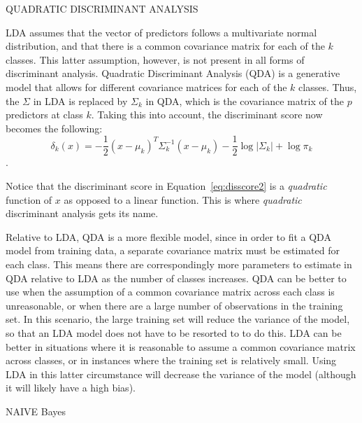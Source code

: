 \documentclass[12pt]{article}
\begin{document}
QUADRATIC DISCRIMINANT ANALYSIS 

LDA assumes that the vector of predictors follows a multivariate normal distribution, 
and that there is a common covariance matrix for each of the $k$ classes.  This latter 
assumption, however, is not present in all forms of discriminant analysis.  Quadratic 
Discriminant Analysis (QDA) is a generative model that allows for different covariance 
matrices for each of the $k$ classes.  Thus, the $\Sigma$ in LDA is replaced by 
$\Sigma_k$ in QDA, which is the covariance matrix of the $p$ predictors at class $k$.  
Taking this into account, the discriminant score now becomes the following:
\begin{equation}
  \label{eq:disscore2}
  \delta_k(x) = -\frac {1} {2} (x - \mu_k) ^ T \Sigma_k ^ {-1} (x - \mu_k) -\frac {1} {2} 
  \log {|\Sigma_k|} + \log {\pi_k}
\end{equation}. 

Notice that the discriminant score in Equation~\eqref{eq:disscore2} is a 
\textit{quadratic} function of $x$ as opposed to a linear function.  This is where 
\textit{quadratic} discriminant analysis gets its name.  

Relative to LDA, QDA is a more flexible model, since in order to fit a QDA model from 
training data, a separate covariance matrix must be estimated for each class.  This 
means there are correspondingly more parameters to estimate in QDA relative to LDA as 
the number of classes increases.  QDA can be better to use when the assumption of a 
common covariance matrix across each class is unreasonable, or when there are a large 
number of observations in the training set.  In this scenario, the large training set 
will reduce the variance of the model, so that an LDA model does not have to be resorted 
to to do this.  LDA can be better in situations where it is reasonable to assume a 
common covariance matrix across classes, or in instances where the training set is 
relatively small.  Using LDA in this latter circumstance will decrease the variance of 
the model (although it will likely have a high bias). 

NAIVE Bayes
\end{document}
